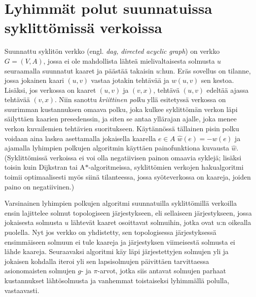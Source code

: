 \documentclass[finnish]{tktltiki2}
\theoremstyle{definition}
\theoremstyle{remark}
\begin{document}
\section{Lyhimmät polut suunnatuissa syklittömissä verkoissa}
Suunnattu syklitön verkko (engl. \textit{dag, directed acyclic graph}) on verkko $G = (V, A)$, jossa ei ole mahdollista lähteä mielivaltaisesta solmusta $u$ seuraamalla suunnatut kaaret ja päästää takaisin $u$:hun. Eräs sovellus on tilanne, jossa jokainen kaari $(u, v)$ vastaa jotakin tehtävää ja $w(u, v)$ sen kestoa. Lisäksi, jos verkossa on kaaret $(u, v)$ ja $(v, x)$, tehtävä $(u, v)$ edeltää ajassa tehtävää $(v, x)$. Niin sanottu \textit{kriittinen polku} yllä esitetyssä verkossa on suurimman kustannuksen omaava polku, joka kulkee syklittömän verkon läpi säilyttäen kaarien presedenssin, ja siten se antaa yllärajan ajalle, joka menee verkon kuvailemien tehtävien suoritukseen. Käytännössä tällainen pisin polku voidaan aina laskea asettamalla jokaisella kaarella $e \in A$ $\hat{w}(e) = -w(e)$ ja ajamalla lyhimpien polkujen algoritmin käyttäen painofunktiona kuvausta $\hat{w}$. (Syklittömissä verkoissa ei voi olla negatiivisen painon omaavia syklejä; lisäksi toisin kuin Dijkstran tai A$\ast$-algoritmeissa, syklittömien verkojen hakualgoritmi toimii optimaalisesti myös siinä tilanteessa, jossa syöteverkossa on kaareja, joiden paino on negatiivinen.)

Varsinainen lyhimpien polkujen algoritmi suunnatuilla syklittömillä verkoilla ensin lajittelee solmut topologiseen järjestykseen, eli sellaiseen järjestykseen, jossa jokaisesta solmusta $u$ lähtevät kaaret osoittavat solmuihin, jotka ovat $u$:n oikealla puolella. Nyt jos verkko on yhdistetty, sen topologisessa järjestyksessä ensimmäiseen solmuun ei tule kaareja ja järjestyksen viimeisestä solmusta ei lähde kaareja. Seuraavaksi algoritmi käy läpi järjestettyjen solmujen yli ja jokaisen kohdalla iteroi yli sen lapsisolmujen päivittäen tarvittaessa asionomaisten solmujen $g$- ja $\pi$-arvot, jotka siis antavat solmujen parhaat kustannukset lähtösolmusta ja vanhemmat toistaiseksi lyhimmällä polulla, vastaavasti.
\end{document}
